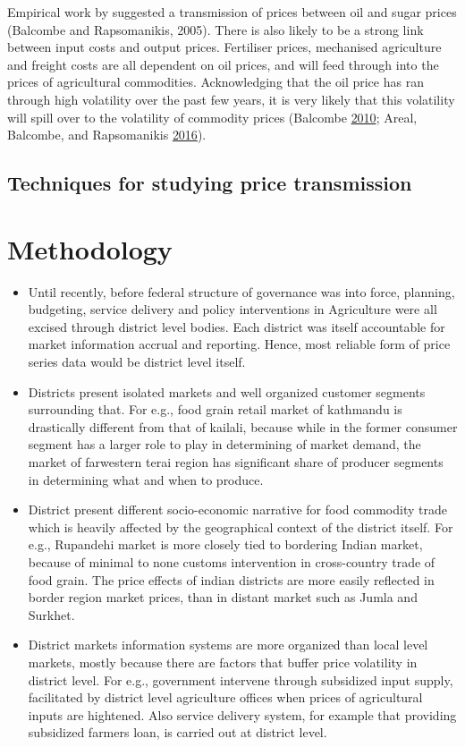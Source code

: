 \documentclass[12pt,]{article}
\providecommand{\tightlist}{%
  \setlength{\itemsep}{0pt}\setlength{\parskip}{0pt}}
\begin{document}
Empirical work by suggested a transmission of prices between oil and sugar prices (Balcombe and Rapsomanikis, 2005). There is also likely to be a strong link between input costs and output prices. Fertiliser prices, mechanised agriculture and freight costs are all dependent on oil prices, and will feed through into the prices of agricultural commodities. Acknowledging that the oil price has ran through high volatility over the past few years, it is very likely that this volatility will spill over to the volatility of commodity prices (Balcombe \protect\hyperlink{ref-balcombe2010nature}{2010}; Areal, Balcombe, and Rapsomanikis \protect\hyperlink{ref-areal2016testing}{2016}).

\hypertarget{techniques-for-studying-price-transmission}{%
\subsection{Techniques for studying price transmission}\label{techniques-for-studying-price-transmission}}

\hypertarget{methodology}{%
\section{Methodology}\label{methodology}}

\begin{itemize}
\tightlist
\item
  Until recently, before federal structure of governance was into force, planning, budgeting, service delivery and policy interventions in Agriculture were all excised through district level bodies. Each district was itself accountable for market information accrual and reporting. Hence, most reliable form of price series data would be district level itself.
\item
  Districts present isolated markets and well organized customer segments surrounding that. For e.g., food grain retail market of kathmandu is drastically different from that of kailali, because while in the former consumer segment has a larger role to play in determining of market demand, the market of farwestern terai region has significant share of producer segments in determining what and when to produce.
\item
  District present different socio-economic narrative for food commodity trade which is heavily affected by the geographical context of the district itself. For e.g., Rupandehi market is more closely tied to bordering Indian market, because of minimal to none customs intervention in cross-country trade of food grain. The price effects of indian districts are more easily reflected in border region market prices, than in distant market such as Jumla and Surkhet.
\item
  District markets information systems are more organized than local level markets, mostly because there are factors that buffer price volatility in district level. For e.g., government intervene through subsidized input supply, facilitated by district level agriculture offices when prices of agricultural inputs are hightened. Also service delivery system, for example that providing subsidized farmers loan, is carried out at district level.
\end{itemize}
\end{document}
